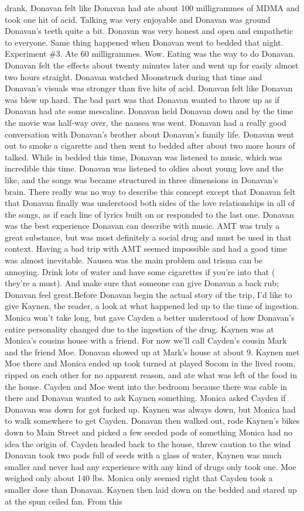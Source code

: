 \documentclass[12pt]{book}
\begin{document}
drank. Donavan felt like Donavan had ate about 100 milligrammes of MDMA and took one hit of acid. Talking was very enjoyable and Donavan was ground Donavan's teeth quite a bit. Donavan was very honest and open and empathetic to everyone. Same thing happened when Donavan went to bedded that night. Experiment \#3. Ate 60 milligrammes. Wow. Eating was the way to do Donavan. Donavan felt the effects about twenty minutes later and went up for easily almost two hours straight. Donavan watched Moonstruck during that time and Donavan's visuals was stronger than five hits of acid. Donavan felt like Donavan was blew up hard. The bad part was that Donavan wanted to throw up as if Donavan had ate some mescaline. Donavan held Donavan down and by the time the movie was half-way over, the nausea was went. Donavan had a really good conversation with Donavan's brother about Donavan's family life. Donavan went out to smoke a cigarette and then went to bedded after about two more hours of talked. While in bedded this time, Donavan was listened to music, which was incredible this time. Donavan was listened to oldies about young love and the like, and the songs was became structured in three dimensions in Donavan's brain. There really was no way to describe this concept except that Donavan felt that Donavan finally was understood both sides of the love relationships in all of the songs, as if each line of lyrics built on or responded to the last one. Donavan was the best experience Donavan can describe with music. AMT was truly a great substance, but was most definitely a social drug and must be used in that context. Having a bad trip with AMT seemed impossible and had a good time was almost inevitable. Nausea was the main problem and trisma can be annoying. Drink lots of water and have some cigarettes if you're into that ( they're a must). And make sure that someone can give Donavan a back rub; Donavan feel great.Before Donavan begin the actual story of the trip, I'd like to give Kaynen, the reader, a look at what happened led up to the time of ingestion. Monica won't take long, but gave Cayden a better understood of how Donavan's entire personality changed due to the ingestion of the drug. Kaynen was at Monica's cousins house with a friend. For now we'll call Cayden's cousin Mark and the friend Moe. Donavan showed up at Mark's house at about 9. Kaynen met Moe there and Monica ended up took turned at played Socom in the lived room, ripped on each other for no apparent reason, and ate what was left of the food in the house. Cayden and Moe went into the bedroom because there was cable in there and Donavan wanted to ask Kaynen something. Monica asked Cayden if Donavan was down for got fucked up. Kaynen was always down, but Monica had to walk somewhere to get Cayden. Donavan then walked out, rode Kaynen's bikes down to Main Street and picked a few seeded pods of something Monica had no idea the origin of. Cayden headed back to the house, threw caution to the wind Donavan took two pods full of seeds with a glass of water, Kaynen was much smaller and never had any experience with any kind of drugs only took one. Moe weighed only about 140 lbs. Monica only seemed right that Cayden took a smaller dose than Donavan. Kaynen then laid down on the bedded and stared up at the spun ceiled fan. From this 
\end{document}
